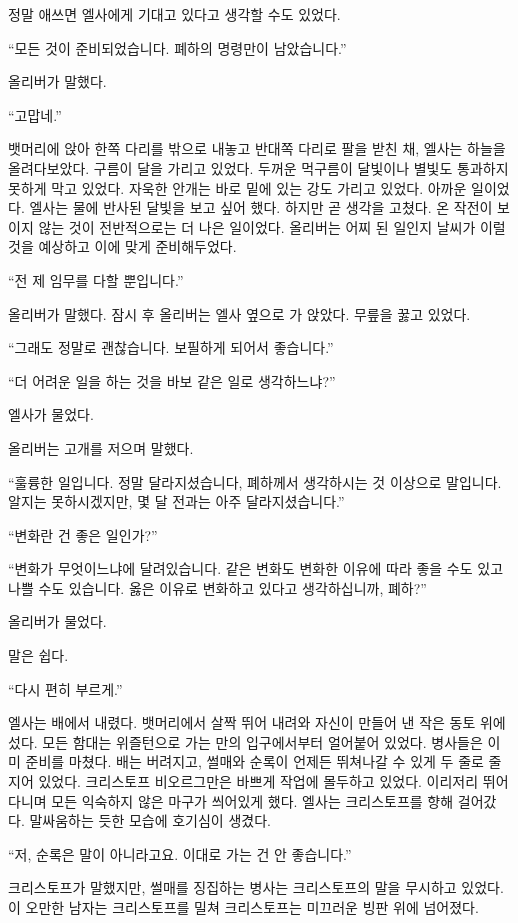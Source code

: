 정말 애쓰면 엘사에게 기대고 있다고 생각할 수도 있었다.

\textbreak

\forceindent``모든 것이 준비되었습니다. 폐하의 명령만이 남았습니다.''

올리버가 말했다.

``고맙네.''

뱃머리에 앉아 한쪽 다리를 밖으로 내놓고 반대쪽 다리로 팔을 받친 채, 엘사는 하늘을 올려다보았다. 구름이 달을 가리고 있었다. 두꺼운 먹구름이 달빛이나 별빛도 통과하지 못하게 막고 있었다. 자욱한 안개는 바로 밑에 있는 강도 가리고 있었다. 아까운 일이었다. 엘사는 물에 반사된 달빛을 보고 싶어 했다. 하지만 곧 생각을 고쳤다. 온 작전이 보이지 않는 것이 전반적으로는 더 나은 일이었다. 올리버는 어찌 된 일인지 날씨가 이럴 것을 예상하고 이에 맞게 준비해두었다.

``전 제 임무를 다할 뿐입니다.''

올리버가 말했다. 잠시 후 올리버는 엘사 옆으로 가 앉았다. 무릎을 꿇고 있었다.

``그래도 정말로 괜찮습니다. 보필하게 되어서 좋습니다.''

``더 어려운 일을 하는 것을 바보 같은 일로 생각하느냐?''

엘사가 물었다.

올리버는 고개를 저으며 말했다.

``훌륭한 일입니다. 정말 달라지셨습니다, 폐하께서 생각하시는 것 이상으로 말입니다. 알지는 못하시겠지만, 몇 달 전과는 아주 달라지셨습니다.''

``변화란 건 좋은 일인가?''

``변화가 무엇이느냐에 달려있습니다. 같은 변화도 변화한 이유에 따라 좋을 수도 있고 나쁠 수도 있습니다. 옳은 이유로 변화하고 있다고 생각하십니까, 폐하?''

올리버가 물었다.

말은 쉽다.

`` 다시 편히 부르게.''

엘사는 배에서 내렸다. 뱃머리에서 살짝 뛰어 내려와 자신이 만들어 낸 작은 동토 위에 섰다. 모든 함대는 위즐턴으로 가는 만의 입구에서부터 얼어붙어 있었다. 병사들은 이미 준비를 마쳤다. 배는 버려지고, 썰매와 순록이 언제든 뛰쳐나갈 수 있게 두 줄로 줄지어 있었다. 크리스토프 비오르그만은 바쁘게 작업에 몰두하고 있었다. 이리저리 뛰어다니며 모든 익숙하지 않은 마구가 씌어있게 했다. 엘사는 크리스토프를 향해 걸어갔다. 말싸움하는 듯한 모습에 호기심이 생겼다.

``저, 순록은 말이 아니라고요. 이대로 가는 건 안 좋습니다.''

크리스토프가 말했지만, 썰매를 징집하는 병사는 크리스토프의 말을 무시하고 있었다. 이 오만한 남자는 크리스토프를 밀쳐 크리스토프는 미끄러운 빙판 위에 넘어졌다.

